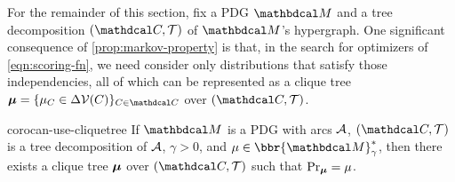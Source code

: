 For the remainder of this section, fix a PDG $\dg M$ and a tree decomposition $(\C, \mathcal T)$ of $\dg M$'s hypergraph.
One significant consequence of \cref{prop:markov-property} is that, in the
search for optimizers of \eqref{eqn:scoring-fn}, we
need consider only distributions that satisfy those independencies,
all of which can be represented as a clique tree
$\bmu = \{\mu_C \in \Delta\V(C) \}_{C \in \C}$
over $(\C, \mathcal T)$.

\begin{linked}{coro}{can-use-cliquetree}
    If $\dg M$ is a PDG with arcs $\mathcal A$, 
    $(\C, \mathcal T)$ is a tree decomposition of $\mathcal A$,
    $\gamma > 0$, and
    $\mu \in \bbr{\dg M}^*_\gamma$, then there exists a clique tree
    $\boldsymbol\mu$ over $(\C, \mathcal T)$ such that $\Pr_{\boldsymbol\mu} = \mu$.
\end{linked}

